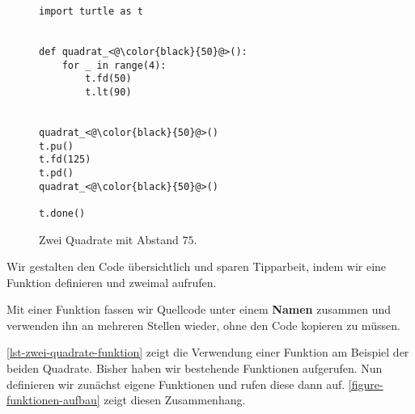 \begin{figure}[htb]
\centering
\begin{minipage}[c][4cm]{0.5\linewidth}
\centering
{}
\caption{Zwei Quadrate mit Abstand $75$.}
\label{figure-zwei-quadrate-funktion}
\end{minipage}
\hfill
\begin{minipage}[c]{0.4\linewidth}
\centering
\begin{lstlisting}[language={python3}, caption={\graybgtexttt{zwei\_quadrate.py}}, label={lst-zwei-quadrate-funktion}]
import turtle as t


def quadrat_<@\color{black}{50}@>():
	for _ in range(4):
		t.fd(50)
		t.lt(90)


quadrat_<@\color{black}{50}@>()
t.pu()
t.fd(125)
t.pd()
quadrat_<@\color{black}{50}@>()

t.done()

\end{lstlisting}
\end{minipage}
\end{figure}

\vspace{-0.5cm}

Wir gestalten den Code übersichtlich und sparen Tipparbeit, indem wir eine Funktion definieren und zweimal aufrufen.

\vfill

\begin{definition}[Funktion]
Mit einer Funktion fassen wir Quellcode unter einem \textbf{Namen} zusammen und verwenden ihn an mehreren Stellen wieder, ohne den Code kopieren zu müssen.
\end{definition}

\newpage

\autoref{lst-zwei-quadrate-funktion} zeigt die Verwendung einer Funktion am Beispiel der beiden Quadrate. Bisher haben wir  bestehende Funktionen aufgerufen. Nun definieren wir zunächst eigene Funktionen und rufen diese dann auf. \autoref{figure-funktionen-aufbau} zeigt diesen Zusammenhang.

